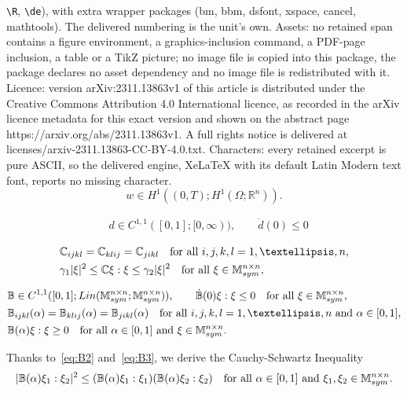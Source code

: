 \documentclass[10pt,a4paper]{amsart}
\def\B {\mathbb B}
\def\C {\mathbb C}
\def\Lin {\mathop {\rm Lin}\nolimits}
\def\M {\mathbb M^{n\times n}_{\rm sym}}
\def\R {\mathbb R}
\begin{document}
\texttt{\textbackslash R}, \texttt{\textbackslash de}), with extra wrapper packages (bm, bbm, dsfont, xspace, cancel, mathtools). The delivered numbering is the unit's own. Assets: no retained span contains a figure environment, a graphics-inclusion command, a PDF-page inclusion, a table or a TikZ picture; no image file is copied into this package, the package declares no asset dependency and no image file is redistributed with it. Licence: version arXiv:2311.13863v1 of this article is distributed under the Creative Commons Attribution 4.0 International licence, as recorded in the arXiv licence metadata for this exact version and shown on the abstract page https://arxiv.org/abs/2311.13863v1. A full rights notice is delivered at licenses/arxiv-2311.13863-CC-BY-4.0.txt. Characters: every retained excerpt is pure ASCII, so the delivered engine, XeLaTeX with its default Latin Modern text font, reports no missing character.
\begin{equation}\label{eq:w}
w\in H^1((0,T);H^1(\Omega;\R^n)).
\end{equation}

\begin{align}
&d\in C^{1,1}([0,1];[0,\infty)),\qquad \dot d(0)\le 0\label{eq:d}
\end{align}

\begin{align}
&\C_{ijkl}=\C_{klij}=\C_{jikl}\quad\text{for all $i,j,k,l=1,\dots,n$},\label{eq:C1}\\
&\gamma_1|\xi|^2\le \C\xi:\xi\le\gamma_2|\xi|^2\quad\text{for all $\xi\in\M$},\label{eq:C2}
\end{align}

\begin{align}
&\B\in C^{1,1}([0,1];\Lin(\M;\M)),\qquad \dot{\B}(0)\xi:\xi\le 0\quad\text{for all $\xi\in\M$},\label{eq:B1}\\
&\B_{ijkl}(\alpha)=\B_{klij}(\alpha)=\B_{jikl}(\alpha)\quad\text{for all $i,j,k,l=1,\dots,n$ and $\alpha\in [0,1]$},\label{eq:B2}\\
&\B(\alpha)\xi:\xi\ge 0\quad\text{for all $\alpha\in[0,1]$ and $\xi\in\M$}.\label{eq:B3}
\end{align}

\begin{remark}\label{rem:BCS}
Thanks to~\eqref{eq:B2} and~\eqref{eq:B3}, we derive the Cauchy-Schwartz Inequality \begin{equation*}
|\B(\alpha)\xi_1:\xi_2|^2\le (\B(\alpha)\xi_1:\xi_1)(\B(\alpha)\xi_2:\xi_2)\quad\text{for all $\alpha\in[0,1]$ and $\xi_1,\xi_2\in\M$}.
\end{equation*}
\end{remark}
\end{document}
